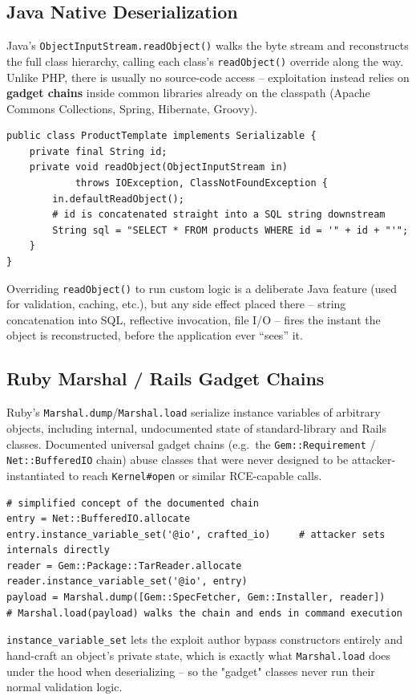 \documentclass[11pt]{article}
\begin{document}
\subsection{Java Native Deserialization}
Java's \texttt{ObjectInputStream.readObject()} walks the byte stream and reconstructs the full class hierarchy, calling each class's \texttt{readObject()} override along the way. Unlike PHP, there is usually no source-code access -- exploitation instead relies on \textbf{gadget chains} inside common libraries already on the classpath (Apache Commons Collections, Spring, Hibernate, Groovy).
\begin{causebox}
\begin{lstlisting}[style=code]
public class ProductTemplate implements Serializable {
    private final String id;
    private void readObject(ObjectInputStream in)
            throws IOException, ClassNotFoundException {
        in.defaultReadObject();
        # id is concatenated straight into a SQL string downstream
        String sql = "SELECT * FROM products WHERE id = '" + id + "'";
    }
}
\end{lstlisting}
Overriding \texttt{readObject()} to run custom logic is a deliberate Java feature (used for validation, caching, etc.), but any side effect placed there -- string concatenation into SQL, reflective invocation, file I/O -- fires the instant the object is reconstructed, before the application ever ``sees'' it.
\end{causebox}

\subsection{Ruby Marshal / Rails Gadget Chains}
Ruby's \texttt{Marshal.dump}/\texttt{Marshal.load} serialize instance variables of arbitrary objects, including internal, undocumented state of standard-library and Rails classes. Documented universal gadget chains (e.g.\ the \texttt{Gem::Requirement} / \texttt{Net::BufferedIO} chain) abuse classes that were never designed to be attacker-instantiated to reach \texttt{Kernel\#open} or similar RCE-capable calls.
\begin{causebox}
\begin{lstlisting}[style=code]
# simplified concept of the documented chain
entry = Net::BufferedIO.allocate
entry.instance_variable_set('@io', crafted_io)     # attacker sets internals directly
reader = Gem::Package::TarReader.allocate
reader.instance_variable_set('@io', entry)
payload = Marshal.dump([Gem::SpecFetcher, Gem::Installer, reader])
# Marshal.load(payload) walks the chain and ends in command execution
\end{lstlisting}
\texttt{instance\_variable\_set} lets the exploit author bypass constructors entirely and hand-craft an object's private state, which is exactly what \texttt{Marshal.load} does under the hood when deserializing -- so the "gadget" classes never run their normal validation logic.
\end{causebox}
\end{document}
